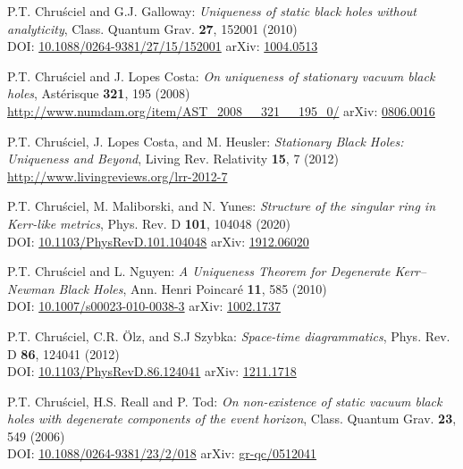 \begin{thebibliography}{123}
P.T. Chru\'sciel and G.J. Galloway:
{\em Uniqueness of static black holes without analyticity},
Class. Quantum Grav. {\bf 27}, 152001 (2010)\\
DOI: \href{https://doi.org/10.1088/0264-9381/27/15/152001}{10.1088/0264-9381/27/15/152001}\hfill
arXiv: \href{https://arxiv.org/abs/1004.0513}{1004.0513}

P.T. Chru\'sciel and J. Lopes Costa:
{\em On uniqueness of stationary vacuum black holes},
Astérisque {\bf 321}, 195 (2008)\\
\url{http://www.numdam.org/item/AST_2008__321__195_0/}\hfill
arXiv: \href{https://arxiv.org/abs/0806.0016}{0806.0016}

P.T. Chru\'sciel, J. Lopes Costa, and M. Heusler:
{\em Stationary Black Holes: Uniqueness and Beyond},
Living Rev. Relativity {\bf 15}, 7 (2012) \\
\url{http://www.livingreviews.org/lrr-2012-7}

P.T. Chru\'sciel, M. Maliborski, and N. Yunes:
{\em Structure of the singular ring in Kerr-like metrics},
Phys. Rev. D {\bf 101}, 104048 (2020)\\
DOI: \href{https://doi.org/10.1103/PhysRevD.101.104048}{10.1103/PhysRevD.101.104048}\hfill
arXiv: \href{https://arxiv.org/abs/1912.06020}{1912.06020}

P.T. Chru\'sciel and L. Nguyen:
{\em A Uniqueness Theorem for Degenerate Kerr–Newman Black Holes},
Ann. Henri Poincar\'e {\bf 11}, 585 (2010)\\
DOI: \href{https://doi.org/10.1007/s00023-010-0038-3}{10.1007/s00023-010-0038-3}\hfill
arXiv: \href{https://arxiv.org/abs/1002.1737}{1002.1737}

P.T. Chru\'sciel, C.R. Ölz, and S.J Szybka:
{\em Space-time diagrammatics},
Phys. Rev. D {\bf 86}, 124041 (2012)\\
DOI:  \href{https://doi.org/10.1103/PhysRevD.86.124041}{10.1103/PhysRevD.86.124041}\hfill
arXiv: \href{https://arxiv.org/abs/1211.1718}{1211.1718}

P.T. Chru\'sciel, H.S. Reall and P. Tod:
{\em On non-existence of static vacuum black holes with degenerate components of the event horizon},
Class. Quantum Grav. {\bf 23}, 549 (2006)\\
DOI: \href{https://doi.org/10.1088/0264-9381/23/2/018}{10.1088/0264-9381/23/2/018}\hfill
arXiv: \href{https://arxiv.org/abs/gr-qc/0512041}{gr-qc/0512041}


\end{thebibliography}
